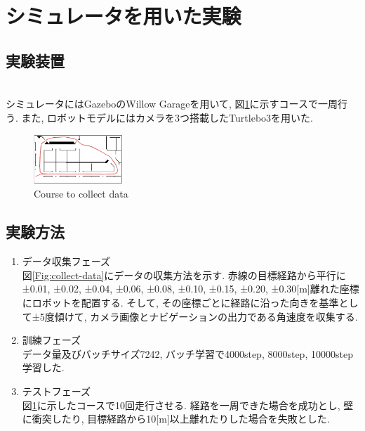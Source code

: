 \documentclass[10pt]{ujarticle}
\begin{document}
    \section{シミュレータを用いた実験}%
    \subsection{実験装置}\mbox{}\\
    シミュレータにはGazeboのWillow Garage\cite{willow}を用いて, 図\ref{Fig:willow}に示すコースで一周行う. また, ロボットモデルにはカメラを3つ搭載したTurtlebo3\cite{turtlebot3}を用いた. 

    \begin{figure}[h]
        \centering
        \includegraphics[width=0.3\textwidth]{fig/willow-garage.png}
        \caption{Course to collect data}
        \label{Fig:willow}
    \end{figure}

    \subsection{実験方法}
    \begin{enumerate}
        \item{データ収集フェーズ}\mbox{}\\図\ref{Fig:collect-data}にデータの収集方法を示す. 赤線の目標経路から平行に±0.01, ±0.02, ±0.04, ±0.06, ±0.08, ±0.10, ±0.15, ±0.20, ±0.30[m]離れた座標にロボットを配置する. そして, その座標ごとに経路に沿った向きを基準として±5度傾けて, カメラ画像とナビゲーションの出力である角速度を収集する. 
        \item{訓練フェーズ}\mbox{}\\データ量及びバッチサイズ7242, バッチ学習で4000step, 8000step, 10000step学習した. 
        \item{テストフェーズ}\mbox{}\\図\ref{Fig:willow}に示したコースで10回走行させる. 経路を一周できた場合を成功とし, 壁に衝突したり, 目標経路から10[m]以上離れたりした場合を失敗とした. 
    \end{enumerate}
\end{document}
